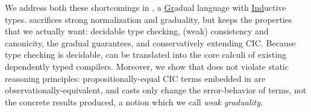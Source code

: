 


We address both these shortcomings in \lang, a \underline{Gr}adual language with \underline{Ind}uctive types.
\lang sacrifices
strong normalization and graduality, but keeps the properties that we actually want: decidable type checking,
(weak) consistency and canonicity, the gradual guarantees, and conservatively extending CIC.
Because type checking is decidable, \lang can be translated into the core calculi of existing dependently typed compilers.
Moreover, we show that \lang does not violate static reasoning principles: propositionally-equal
CIC terms embedded in \lang are observationally-equivalent,
and casts only change the error-behavior of terms, not the concrete results produced, a
notion which we call \textit{weak graduality}.

